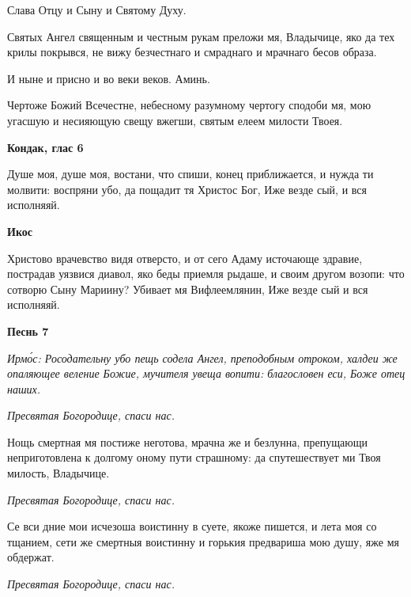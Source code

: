    Слава Отцу и Сыну и Святому Духу.



   Святых Ангел священным и честным рукам преложи мя, Владычице, яко
да тех крилы покрывся, не вижу безчестнаго и смраднаго и мрачнаго бесов
образа.



   И ныне и присно и во веки веков. Аминь.



   Чертоже Божий Всечестне, небесному разумному чертогу сподоби мя,
мою угасшую и несияющую свещу вжегши, святым елеем милости
Твоея.



 

\bfseries Кондак, глас 6\normalfont{}


   Душе моя, душе моя, востани, что спиши, конец приближается, и нужда
ти молвити: воспряни убо, да пощадит тя Христос Бог, Иже везде сый, и вся
исполняяй.




 

\bfseries Икос\normalfont{}


   Христово врачевство видя отверсто, и от сего Адаму источающе здравие,
пострадав уязвися диавол, яко беды приемля рыдаше, и своим другом
возопи: что сотворю Сыну Мариину? Убивает мя Вифлеемлянин, Иже везде
сый и вся исполняяй.



 

\bfseries Песнь 7\normalfont{}


 \itshape Ирмо́с:\normalfont{} Росодательну убо пещь содела Ангел, преподобным отроком, халдеи же
опаляющее веление Божие, мучителя увеща вопити: благословен еси, Боже отец
наших.



 \itshape  Пресвятая Богородице, спаси нас.
\normalfont{}


   Нощь смертная мя постиже неготова, мрачна же и безлунна, препущающи
неприготовлена к долгому оному пути страшному: да спутешествует ми Твоя
милость, Владычице.



 \itshape  Пресвятая Богородице, спаси нас.
\normalfont{}


   Се вси дние мои исчезоша воистинну в суете, якоже пишется, и лета моя
со тщанием, сети же смертныя воистинну и горькия предвариша мою душу,
яже мя обдержат.



 \itshape  Пресвятая Богородице, спаси нас.
\normalfont{}


